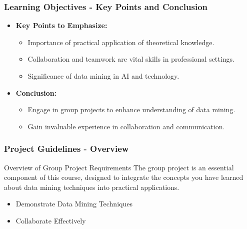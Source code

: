 \documentclass[aspectratio=169]{beamer}
\begin{document}
\begin{frame}[fragile]
    \frametitle{Learning Objectives - Key Points and Conclusion}
    \begin{itemize}
        \item \textbf{Key Points to Emphasize:}
        \begin{itemize}
            \item Importance of practical application of theoretical knowledge.
            \item Collaboration and teamwork are vital skills in professional settings.
            \item Significance of data mining in AI and technology.
        \end{itemize}
        \item \textbf{Conclusion:} 
        \begin{itemize}
            \item Engage in group projects to enhance understanding of data mining.
            \item Gain invaluable experience in collaboration and communication.
        \end{itemize}
    \end{itemize}
\end{frame}

\begin{frame}[fragile]
    \frametitle{Project Guidelines - Overview}
    \begin{block}{Overview of Group Project Requirements}
        The group project is an essential component of this course, designed to integrate the concepts you have learned about data mining techniques into practical applications. 
    \end{block}
    \begin{itemize}
        \item Demonstrate Data Mining Techniques
        \item Collaborate Effectively
    \end{itemize}
\end{frame}
\end{document}
